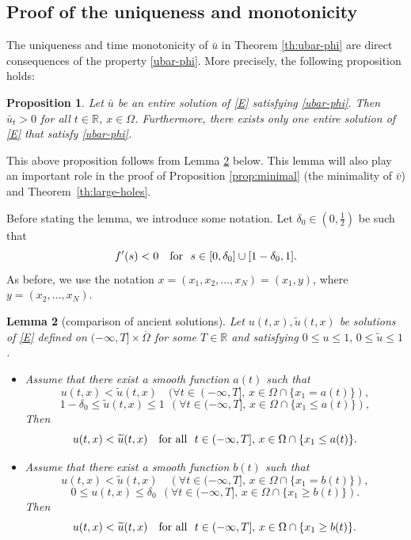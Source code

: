 \documentclass[a4paper,12pt,fullpage]{article}
\numberwithin{equation}{section}
\newtheorem{Lemma}{Lemma}[section]
\newtheorem{Prop}[Lemma]{Proposition}
\def\R{{\mathbb R}}
\begin{document}

\subsection{Proof of the uniqueness and monotonicity}\label{ss:comparison}

The uniqueness and time monotonicity of $\bar{u}$ in Theorem \ref{th:ubar-phi} are direct consequences of the property \eqref{ubar-phi}. More precisely, the following proposition holds:

\begin{Prop}\label{prop:uniqueness}
Let $\bar{u}$ be an entire solution of \eqref{E} satisfying \eqref{ubar-phi}. Then $\bar{u}_t>0$ for all $t\in\R$, $x\in\Omega$. Furthermore, there exists only one entire solution of \eqref{E} that satisfy \eqref{ubar-phi}.
\end{Prop}

This above proposition follows from Lemma \ref{lem:comparison-ancient} below. This lemma will also play an important role in the proof of Proposition \ref{prop:minimal} (the minimality of $\bar{v}$) and Theorem~\ref{th:large-holes}.

Before stating the lemma, we introduce some notation. Let $\delta_0\in (0,\frac12)$ be such that
\begin{equation}\label{delta}
f'(s)<0 \quad \hbox{for} \ \ s\in[0,\delta_0]\cup[1-\delta_0,1]. 
\end{equation}
As before, we use the notation $x=(x_1,x_2,\ldots,x_N)=(x_1,y)$, where $y=(x_2,\ldots,x_N)$.

\begin{Lemma}[comparison of ancient solutions]\label{lem:comparison-ancient}
Let $u(t,x), \widetilde{u}(t,x)$ be solutions of \eqref{E} defined on $(-\infty, T]\times\overline{\Omega}$ for some $T\in\R$ and satisfying $0\leq u\leq 1,\, 0\leq \widetilde{u}\leq 1$. 
 \begin{itemize}
\item[{\rm (i)}] 
Assume that there exist a smooth function $ a(t)$ such that
\[
u(t, x)<\widetilde{u}(t, x)\quad ({}\forall t\in (-\infty,T], \,x\in \Omega\cap\{x_1 = a(t)\}),
\]
\[
1-\delta_0\leq \widetilde{u}(t,x)\leq 1 \ \ \left({}\forall t\in (-\infty,T], \, x\in \Omega\cap\{x_1\leq  a(t)\}\right),
\]
Then
\[
u(t,x)<\widetilde{u}(t,x) \quad \hbox{for all}\ \ t\in (-\infty,T], \, x\in \Omega\cap\{x_1\leq  a(t)\}.
\]
\item[{\rm (ii)}] 
Assume that there exist a smooth function $b(t)$ such that
\[
u(t, x)<\widetilde{u}(t, x)\quad \left({}\forall t\in (-\infty,T], \,x\in \Omega\cap\{x_1=  b(t)\}\right),
\]
\[
0\leq u(t,x)\leq \delta_0 \ \ \left({}\forall t\in (-\infty,T],\,  x\in \Omega\cap\{x_1\geq  b(t)\}\right).
\]
Then
\[
u(t,x)<\widetilde{u}(t,x) \quad \hbox{for all}\ \ t\in (-\infty,T], \, x\in \Omega\cap\{x_1\geq  b(t)\}.
\]
\end{itemize}
\end{Lemma}
\end{document}

